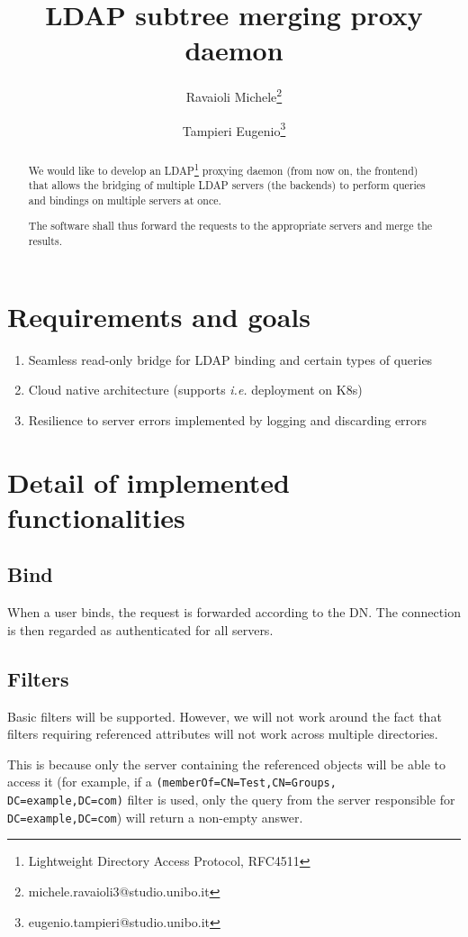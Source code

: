 \documentclass[a4paper,12pt]{article}
\title{LDAP subtree merging proxy daemon}
\author{Ravaioli Michele\thanks{michele.ravaioli3@studio.unibo.it} \and Tampieri Eugenio\thanks{eugenio.tampieri@studio.unibo.it}}
\begin{document}
    \maketitle
    \begin{abstract}
        \par We would like to develop an LDAP\footnote{Lightweight Directory Access Protocol, RFC4511}
        proxying daemon (from now on, the frontend) that allows the bridging of multiple LDAP
        servers (the backends) to perform queries and bindings on multiple servers at once. 
        \par The software shall thus forward the requests to the appropriate servers and merge
        the results.
    \end{abstract}
    \section{Requirements and goals}
        \begin{enumerate}
            \item Seamless read-only bridge for LDAP binding and certain types of queries
            \item Cloud native architecture (supports \emph{i.e.} deployment on K8s)
            \item Resilience to server errors implemented by logging and discarding errors
        \end{enumerate}
    \section{Detail of implemented functionalities}
        \subsection{Bind}
            \par When a user binds, the request is forwarded according to the DN. The
            connection is then regarded as authenticated for all servers.
        \subsection{Filters}
            \par Basic filters will be supported. However, we will not work around the fact
            that filters requiring referenced attributes will not work across multiple
            directories.
            \par This is because only the server containing the referenced objects will be able
            to access it (for example, if a \texttt{(memberOf=CN=Test,CN=Groups,\\DC=example,DC=com)}
            filter is used, only the query from the server responsible for \texttt{DC=example,DC=com})
            will return a non-empty answer.
\end{document}
